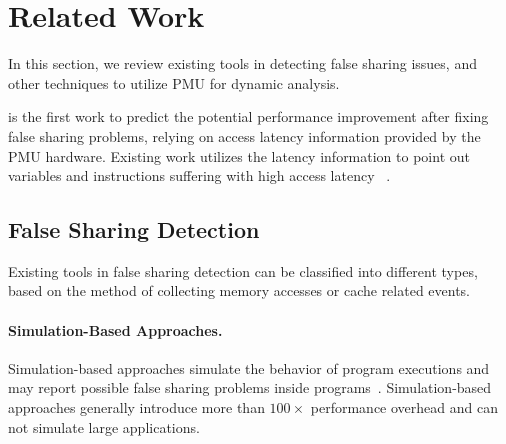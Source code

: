 \section{Related Work}

\label{sec:relatedwork}

 

In this section, we review existing tools in detecting false sharing issues, and other techniques to utilize PMU for dynamic analysis.

\cheetah{} is the first work to predict the potential performance improvement after fixing false sharing problems, relying on access latency information provided by the PMU hardware. Existing work utilizes the latency information to point out variables and instructions suffering with high access latency ~\cite{ibs-sc, ibs-pact}. 

\subsection{False Sharing Detection}

Existing tools in false sharing detection can be classified into different types, based on the method of collecting memory accesses or cache related events. 

\paragraph{Simulation-Based Approaches.} Simulation-based approaches simulate the behavior of program executions and may report possible false sharing problems inside programs~\cite{falseshare:simulator}. Simulation-based approaches generally introduce more than $100\times$ performance overhead and can not simulate large applications. 

